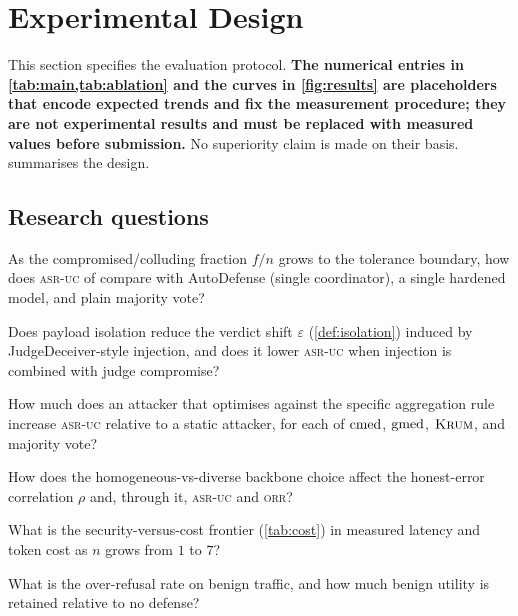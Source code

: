 \section{Experimental Design}
\label{sec:experiments}

This section specifies the evaluation protocol. \textbf{The numerical entries in
\cref{tab:main,tab:ablation} and the curves in \cref{fig:results} are placeholders that
encode expected trends and fix the measurement procedure; they are not experimental
results and must be replaced with measured values before submission.} No superiority claim
is made on their basis.  summarises the design.



\subsection{Research questions}
\begin{description}[leftmargin=0em,itemsep=2pt,topsep=2pt]
  \item[\textnormal{RQ1 (integrity under compromise).}] As the compromised/colluding
        fraction $f/n$ grows to the tolerance boundary, how does \textsc{asr-uc} of \Aegis
        compare with AutoDefense (single coordinator), a single hardened model, and plain
        majority vote?
  \item[\textnormal{RQ2 (second-order injection).}] Does payload isolation reduce the
        verdict shift $\varepsilon$ (\cref{def:isolation}) induced by JudgeDeceiver-style
        injection, and does it lower \textsc{asr-uc} when injection is combined with judge
        compromise?
  \item[\textnormal{RQ3 (adaptivity).}] How much does an attacker that optimises against
        the specific aggregation rule increase \textsc{asr-uc} relative to a static
        attacker, for each of $\operatorname{cmed}$, $\operatorname{gmed}$, $\textsc{Krum}$, and majority vote?
  \item[\textnormal{RQ4 (correlated failure).}] How does the homogeneous-vs-diverse
        backbone choice affect the honest-error correlation $\rho$ and, through it,
        \textsc{asr-uc} and \textsc{orr}?
  \item[\textnormal{RQ5 (cost).}] What is the security-versus-cost frontier
        (\cref{tab:cost}) in measured latency and token cost as $n$ grows from $1$ to $7$?
  \item[\textnormal{RQ6 (utility).}] What is the over-refusal rate on benign traffic, and
        how much benign utility is retained relative to no defense?
\end{description}

